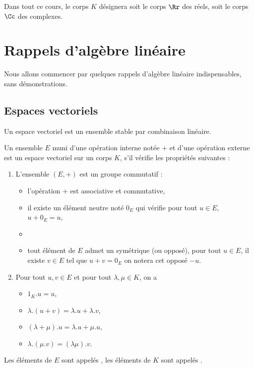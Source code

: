 \documentclass[class=report,crop=false]{standalone}
\begin{document}


\tableofcontents

Dans tout ce cours, le corps $K$ désignera soit le corps $\Rr$ des réels, 
soit le corps $\Cc$ des complexes.


\chapter{Rappels d'algèbre linéaire}

Nous allons commencer par quelques rappels d'algèbre linéaire 
indispensables, sans démonstrations.


\section{Espaces vectoriels}


Un espace vectoriel est un ensemble stable par combinaison linéaire.

\begin{definition}
Un ensemble $E$ muni d'une opération interne notée $+$ 
et d'une opération externe est un espace vectoriel sur un corps $K$, 
s'il vérifie les propriétés suivantes :
\begin{enumerate}
  \item L'ensemble $(E,+)$ est un groupe commutatif :
  \begin{itemize}
    \item l'opération $+$ est associative et commutative,
    \item il existe un élément neutre noté $0_E$ qui vérifie pour tout $u\in E$, $u+0_E=u$,    \item
    \item tout élément de $E$ admet un symétrique (ou opposé), pour tout $u\in E$, il existe $v\in E$ tel que $u+v=0_E$ on notera cet opposé
$-u$.
  \end{itemize}

  \item Pour tout $u,v\in E$ et pour tout $\lambda,\mu\in K$, on a
  \begin{itemize}
    \item $1_K . u=u$,
    \item $\lambda.(u+v)=\lambda.u+\lambda.v$,
    \item $(\lambda+\mu).u=\lambda.u+\mu.u$,
    \item $\lambda.(\mu.v)=(\lambda\mu).v.$
  \end{itemize}  
\end{enumerate}


Les éléments de $E$ sont appelés , 
les éléments de $K$ sont appelés .
  
\end{definition}
\end{document}
